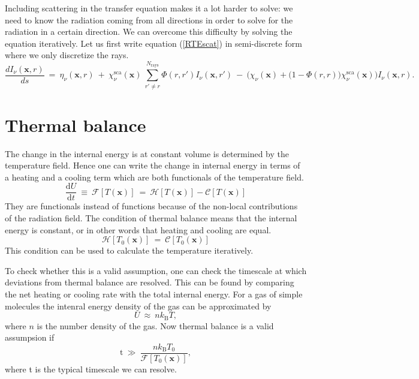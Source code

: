 \documentclass[]{article}
\newcommand{\kb}{k_{\text{B}}}
\newcommand{\D}{\text{d}}
\begin{document}
\bigskip

Including scattering in the transfer equation makes it a lot harder to solve: we need to know the radiation coming from all directions in order to solve for the radiation in a certain direction. We can overcome this difficulty by solving the equation iteratively. Let us first write equation (\ref{RTEscat}) in semi-discrete form where we only discretize the rays.
\begin{equation}
\frac{d I_{\nu}(\textbf{x},r)}{ds} \ = \ \eta_{\nu}(\textbf{x},r) \ + \ \chi_{\nu}^{\text{sca}}(\textbf{x}) \ \sum_{r' \neq r}^{N_{\text{rays}}} \Phi(r,r') I_{\nu}(\textbf{x},r') \ - \ \Big( \chi_{\nu}(\textbf{x}) + \big( 1 - \Phi(r,r) \big) \chi_{\nu}^{\text{sca}}(\textbf{x}) \Big) I_{\nu}(\textbf{x},r).
\label{RTEscat}
\end{equation}


\section{Thermal balance}

The change in the internal energy is at constant volume is determined by the temperature field. Hence one can write the change in internal energy in terms of a heating and a cooling term which are both functionals of the temperature field.
\begin{equation}
\frac{\D U}{\D t} \ \equiv \ \mathcal{F}\left[T(\textbf{x})\right]  \ = \ \mathcal{H}\left[T(\textbf{x})\right] - \mathcal{C}\left[T(\textbf{x})\right]
\end{equation}
They are functionals instead of functions because of the non-local contributions of the radiation field. The condition of thermal balance means that the internal energy is constant, or in other words that heating and cooling are equal.
\begin{equation}
\mathcal{H}\left[T_{0}(\textbf{x})\right] \ = \ \mathcal{C}\left[T_{0}(\textbf{x})\right]
\end{equation}
This condition can be used to calculate the temperature iteratively.

\bigskip

To check whether this is a valid assumption, one can check the timescale at which deviations from thermal balance are resolved. This can be found by comparing the net heating or cooling rate with the total internal energy. For a gas of simple molecules the intenral energy density of the gas can be approximated by
\begin{equation}
U \ \approx \ n \kb T ,
\end{equation}
where $n$ is the number density of the gas. Now thermal balance is a valid assumpsion if
\begin{equation}
\text{t} \ \gg \ \frac{n \kb T_{0}}{ \mathcal{F}\left[T_{0}(\textbf{x})\right] },
\end{equation}
where t is the typical timescale we can resolve.
\end{document}
